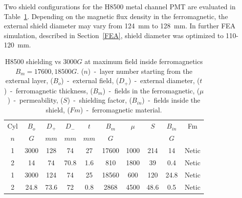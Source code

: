 \documentclass[12pt]{article}
\begin{document}
Two shield  configurations for the H8500 metal channel PMT are evaluated 
 in Table~\ref{H8500at17600}.
Depending on the  magnetic flux density in the  ferromagnetic,
the external shield diameter may vary from  124~mm to 128~mm.  
In further  FEA simulation, described in Section~\ref{FEA},
 shield diameter  was  optimized to  110-120~mm.
%
%
\begin{table}[htbp]
\begin{center}
\begin{tabular}{|c|c|c|c|c|c|c|c|c|c|} \hline
Cyl&$B_{o}$& $D_+$ & $D_-$ & $t$  & $B_m$  & $\mu$   & $S$    &$B_{in}$         & Fm \\
$n$&$G$    & $mm$  & $mm$  & $mm$ & $G$   &         &        &$G$             &       \\ \hline  
1 &3000    &  128  &  74   & 27   &  17600 &  1000   &  214   &  14             & Netic \\
2 &14      &  74   &  70.8 & 1.6  &  810   &  1800   &  39    & 0.4             & Netic  \\ \hline \hline
1&3000     &   124 &  74   & 25   & 18560  & 600     & 120    & 24.8            & Netic \\ 
2&24.8     & 73.6  &  72   & 0.8  & 2868   & 4500    & 48.6   & 0.5             & Netic \\ \hline
\end{tabular}                                                      
\end{center}
\caption{\small{H8500 shielding  vs  $3000G$  at maximum
field inside  ferromagnetics  $B_m=17600,18500G$.
($n$)~-~layer number starting from the external layer,
($B_{o}$)~-~external field,
($D_+$)~-~external diameter,
($t$)~-~ferromagnetic thickness,%
($B_m$)~-~fields in the ferromagnetic, %
($\mu$)~-~permeability,%
($S$)~-~shielding factor,%
($B_{in}$)~-~fields inside the shield,%
($Fm$)~-~ferromagnetic material.} \label{H8500at17600} }
\end{table}
\end{document}
